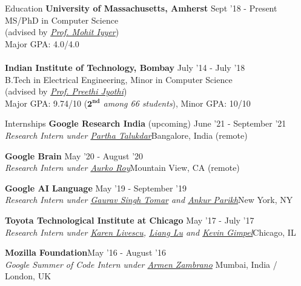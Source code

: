 \documentclass{resume} %
\begin{document}
\begin{rSection}{Education}
\vspace*{0.1in}
{\bf University of Massachusetts, Amherst} \hfill {Sept '18 - Present} \\ MS/PhD in Computer Science \\ (advised by \textit{\href{https://people.cs.umass.edu/~miyyer/}{Prof. Mohit Iyyer}}) \\
Major GPA: 4.0/4.0\\\\
{\bf Indian Institute of Technology, Bombay} \hfill {July '14 - July '18} \\ 
B.Tech in Electrical Engineering, Minor in Computer Science\\
(advised by \textit{\href{https://www.cse.iitb.ac.in/~pjyothi/}{Prof. Preethi Jyothi}})\\
Major GPA: 9.74/10 (\textit{$\mathbf{2^{nd}}$ among 66 students}), Minor GPA: 10/10
\end{rSection}

\begin{rSection}{Internships}
\vspace*{0.1in}
{\bf Google Research India} (upcoming) { \hfill June '21 - September '21}\\ \textit{Research Intern under \href{http://talukdar.net/}{Partha Talukdar}}{\hfill Bangalore, India (remote)}

{\bf Google Brain} { \hfill May '20 - August '20}\\ \textit{Research Intern under \href{https://sites.google.com/site/royaurko/}{Aurko Roy}}{\hfill Mountain View, CA (remote)}

{\bf Google AI Language}{ \hfill May '19 - September '19}\\ \textit{Research Intern under \href{https://ai.google/research/people/GauravSinghTomar/}{Gaurav Singh Tomar} and \href{www.ankurparikh.com}{Ankur Parikh}}{\hfill New York, NY}

{\bf Toyota Technological Institute at Chicago}{ \hfill May '17 - July '17}\\ \textit{Research Intern under \href{http://ttic.uchicago.edu/~klivescu/}{Karen Livescu}, \href{http://ttic.uchicago.edu/~llu/}{Liang Lu} and \href{http://ttic.uchicago.edu/~kgimpel/}{Kevin Gimpel}}{\hfill Chicago, IL}

{\bf Mozilla Foundation}{\hfill May '16 - August '16} \\ \textit{Google Summer of Code Intern under \href{https://github.com/armenzg}{Armen Zambrano}}{ \hfill Mumbai, India / London, UK}
\end{rSection}
\end{document}
